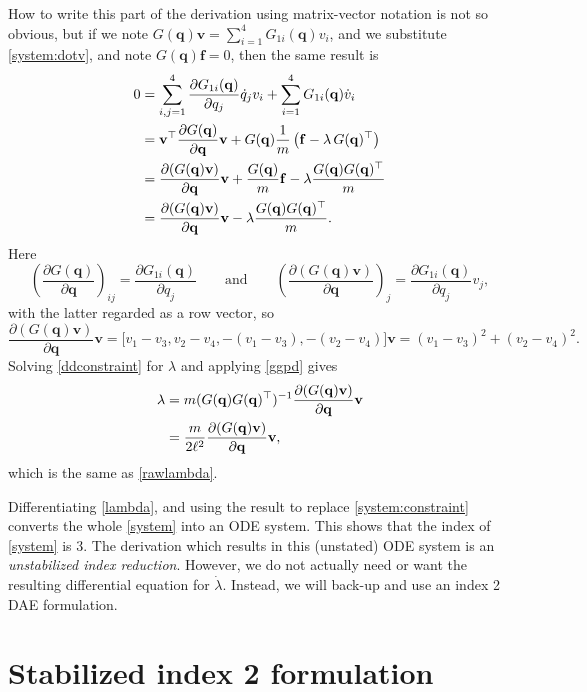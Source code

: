 \documentclass[letterpaper,final,12pt,reqno]{amsart}
\newcommand{\bbf}{\mathbf{f}}
\newcommand{\bq}{\mathbf{q}}
\newcommand{\bv}{\mathbf{v}}
\begin{document}
How to write this part of the derivation using matrix-vector notation is not so obvious, but if we note $G(\bq)\bv = \sum_{i=1}^4 G_{1i}(\bq) v_i$, and we substitute \eqref{system:dotv}, and note $G(\bq) \bbf = 0$, then the same result is
\begin{align}
0 &= \sum_{i,j=1}^4 \frac{\partial G_{1i}(\bq)}{\partial q_j} \dot q_j v_i + \sum_{i=1}^4 G_{1i}(\bq) \dot v_i \notag \\
  &= \bv^\top \frac{\partial G(\bq)}{\partial \bq} \bv + G(\bq) \frac{1}{m} \left(\bbf - \lambda\, G(\bq)^\top\right) \notag \\
  &= \frac{\partial (G(\bq)\bv)}{\partial \bq} \bv +  \frac{G(\bq)}{m} \bbf - \lambda \frac{G(\bq) G(\bq)^\top}{m} \notag \\
  &= \frac{\partial (G(\bq)\bv)}{\partial \bq} \bv - \lambda \frac{G(\bq) G(\bq)^\top}{m}.  \label{ddconstraint}
\end{align}
Here
\begin{equation}
\left(\frac{\partial G(\bq)}{\partial \bq}\right)_{ij} = \frac{\partial G_{1i}(\bq)}{\partial q_j} \qquad \text{and} \qquad
\left(\frac{\partial (G(\bq)\bv)}{\partial \bq}\right)_{j} = \frac{\partial G_{1i}(\bq)}{\partial q_j} v_j,
\end{equation}
with the latter regarded as a row vector, so
\begin{equation}
\frac{\partial (G(\bq)\bv)}{\partial \bq} \bv = \big[v_1-v_3,v_2-v_4,-(v_1-v_3),-(v_2-v_4)\big] \bv = (v_1 - v_3)^2 + (v_2 - v_4)^2.
\end{equation}
Solving \eqref{ddconstraint} for $\lambda$ and applying \eqref{ggpd} gives
\begin{align}
\lambda &= m (G(\bq) G(\bq)^\top)^{-1} \frac{\partial (G(\bq)\bv)}{\partial \bq} \bv \notag \\
        &= \frac{m}{2\ell^2} \frac{\partial (G(\bq)\bv)}{\partial \bq} \bv, \label{lambda}
\end{align}
which is the same as \eqref{rawlambda}.

Differentiating \eqref{lambda}, and using the result to replace \eqref{system:constraint} converts the whole \eqref{system} into an ODE system.  This shows that the index of \eqref{system} is 3.  The derivation which results in this (unstated) ODE system is an \emph{unstabilized index reduction}.  However, we do not actually need or want the resulting differential equation for $\dot \lambda$.  Instead, we will back-up and use an index 2 DAE formulation.


\section{Stabilized index 2 formulation}
\end{document}
